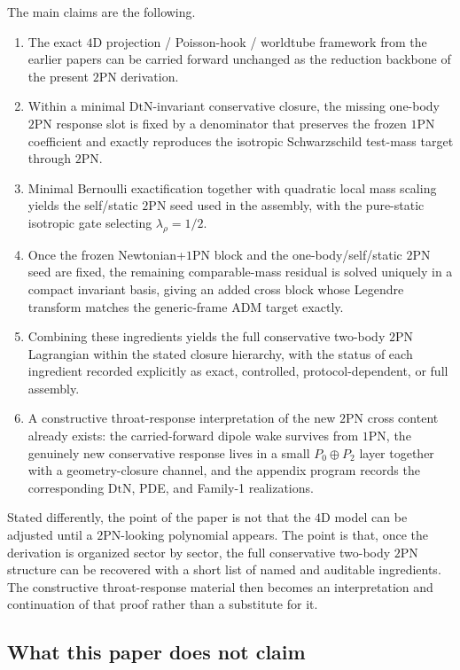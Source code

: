 \documentclass[11pt]{article}
\newcommand{\OnePN}{\mathrm{1PN}}
\newcommand{\TwoPN}{\mathrm{2PN}}
\newcommand{\ADM}{\mathrm{ADM}}
\newcommand{\DtN}{\mathrm{DtN}}
\begin{document}
The main claims are the following.
\begin{enumerate}[leftmargin=1.5em]
  \item The exact $4$D projection / Poisson-hook / worldtube framework from the earlier papers can be carried forward unchanged as the reduction backbone of the present $\TwoPN$ derivation.
  \item Within a minimal $\DtN$-invariant conservative closure, the missing one-body $\TwoPN$ response slot is fixed by a denominator that preserves the frozen $\OnePN$ coefficient and exactly reproduces the isotropic Schwarzschild test-mass target through $\TwoPN$.
  \item Minimal Bernoulli exactification together with quadratic local mass scaling yields the self/static $\TwoPN$ seed used in the assembly, with the pure-static isotropic gate selecting $\lambda_\rho=1/2$.
  \item Once the frozen Newtonian+$\OnePN$ block and the one-body/self/static $\TwoPN$ seed are fixed, the remaining comparable-mass residual is solved uniquely in a compact invariant basis, giving an added cross block whose Legendre transform matches the generic-frame $\ADM$ target exactly.
  \item Combining these ingredients yields the full conservative two-body $\TwoPN$ Lagrangian within the stated closure hierarchy, with the status of each ingredient recorded explicitly as exact, controlled, protocol-dependent, or full assembly.
  \item A constructive throat-response interpretation of the new $\TwoPN$ cross content already exists: the carried-forward dipole wake survives from $1$PN, the genuinely new conservative response lives in a small $P_0\oplus P_2$ layer together with a geometry-closure channel, and the appendix program records the corresponding $\DtN$, PDE, and Family-1 realizations.
\end{enumerate}

Stated differently, the point of the paper is not that the $4$D model can be adjusted until a $2$PN-looking polynomial appears.
The point is that, once the derivation is organized sector by sector, the full conservative two-body $2$PN structure can be recovered with a short list of named and auditable ingredients.
The constructive throat-response material then becomes an interpretation and continuation of that proof rather than a substitute for it.

\subsection{What this paper does not claim}
\label{sec:intro-nonclaims}
\end{document}
